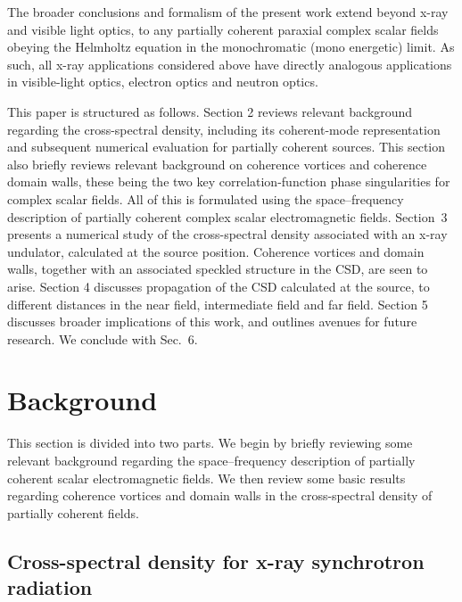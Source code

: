 \documentclass[%
 reprint,
 amsmath,amssymb,
 aps,
]{revtex4-1}
\begin{document}
The broader conclusions and formalism of the present work extend beyond x-ray and visible light optics, to any partially coherent paraxial complex scalar fields obeying the Helmholtz equation in the monochromatic (mono energetic) limit.  As such, all x-ray applications considered above have directly analogous applications in visible-light optics, electron optics and neutron optics.

This paper is structured as follows. Section 2 reviews relevant background regarding the cross-spectral density, including its coherent-mode representation and subsequent numerical evaluation for partially coherent sources.  This section also briefly reviews relevant background on coherence vortices and coherence domain walls, these being the two key correlation-function phase singularities for complex scalar fields.  All of this is formulated using the space--frequency description of partially coherent complex scalar electromagnetic fields.  Section~3 presents a numerical study of the cross-spectral density associated with an x-ray undulator, calculated at the source position.  Coherence vortices and domain walls, together with an associated speckled structure in the CSD, are seen to arise. Section 4 discusses propagation of the CSD calculated at the source, to different distances in the near field, intermediate field and far field. Section 5 discusses broader implications of this work, and outlines avenues for future research.  We conclude with Sec.~6.

\section{Background}

This section is divided into two parts.  We begin by briefly reviewing some relevant background regarding the space--frequency description of partially coherent scalar electromagnetic fields.  We then review some basic results regarding coherence vortices and domain walls in the cross-spectral density of partially coherent fields.  

\subsection{Cross-spectral density for x-ray synchrotron radiation}
\end{document}
